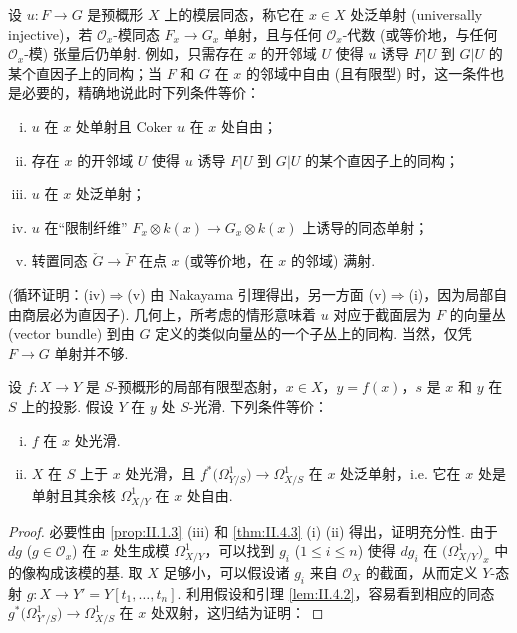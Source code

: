 设 $u \colon F \to G$ 是预概形 $X$ 上的模层同态，称它在 $x \in X$ 处泛单射 (universally injective)，若 $\mathcal{O}_x$-模同态 $F_x \to G_x$ 单射，且与任何 $\mathcal{O}_x$-代数 (或等价地，与任何 $\mathcal{O}_x$-模) 张量后仍单射. 例如，只需存在 $x$ 的开邻域 $U$ 使得 $u$ 诱导 $F|U$ 到 $G|U$ 的某个直因子上的同构；当 $F$ 和 $G$ 在 $x$ 的邻域中自由 (且有限型) 时，这一条件也是必要的，精确地说此时下列条件等价：
\begin{enumerate}[(i)]
\item $u$ 在 $x$ 处单射且 Coker $u$ 在 $x$ 处自由；
\item 存在 $x$ 的开邻域 $U$ 使得 $u$ 诱导 $F|U$ 到 $G|U$ 的某个直因子上的同构；
\item $u$ 在 $x$ 处泛单射；
\item $u$ 在``限制纤维'' $F_x \otimes k(x) \to G_x \otimes k(x)$ 上诱导的同态单射；
\item 转置同态 $\check{G} \to \check{F}$ 在点 $x$ (或等价地，在 $x$ 的邻域) 满射.
\end{enumerate}
(循环证明：(iv)$\Rightarrow$(v) 由 Nakayama 引理得出，另一方面 (v)$\Rightarrow$(i)，因为局部自由商层必为直因子). 几何上，所考虑的情形意味着 $u$ 对应于截面层为 $F$ 的向量丛 (vector bundle) 到由 $G$ 定义的类似向量丛的一个子丛上的同构. 当然，仅凭 $F \to G$ 单射并不够.

\begin{corollary}\label{cor:II.4.5}
设 $f \colon X \to Y$ 是 $S$-预概形的局部有限型态射，$x \in X$，$y = f(x)$，$s$ 是 $x$ 和 $y$ 在 $S$ 上的投影. 假设 $Y$ 在 $y$ 处 $S$-光滑. 下列条件等价：
\begin{enumerate}[(i)]
\item $f$ 在 $x$ 处光滑.
\item $X$ 在 $S$ 上于 $x$ 处光滑，且 $f^{*}\bigl(\varOmega_{Y/S}^{1}\bigr) \to \varOmega_{X/S}^{1}$ 在 $x$ 处泛单射，i.e. 它在 $x$ 处是单射且其余核 $\varOmega_{X/Y}^{1}$ 在 $x$ 处自由.
\end{enumerate}
\end{corollary}

\begin{proof}
必要性由 \ref{prop:II.1.3} (iii) 和 \ref{thm:II.4.3} (i) (ii) 得出，证明充分性. 由于 $dg$ ($g \in \mathcal{O}_x$) 在 $x$ 处生成模 $\varOmega_{X/Y}^{1}$，可以找到 $g_i$ ($1 \leqslant i \leqslant n$) 使得 $dg_i$ 在 $\bigl(\varOmega_{X/Y}^{1}\bigr)_x$ 中的像构成该模的基. 取 $X$ 足够小，可以假设诸 $g_i$ 来自 $\mathcal{O}_X$ 的截面，从而定义 $Y$-态射 $g \colon X \to Y' = Y[t_1, \dots, t_n]$. 利用假设和引理 \ref{lem:II.4.2}，容易看到相应的同态 $g^{*}\bigl(\varOmega_{Y'/S}^{1}\bigr) \to \varOmega_{X/S}^{1}$ 在 $x$ 处双射，这归结为证明：
\end{proof}

